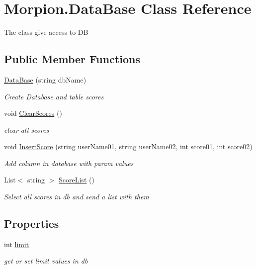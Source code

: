 \hypertarget{class_morpion_1_1_data_base}{}\section{Morpion.\+Data\+Base Class Reference}
\label{class_morpion_1_1_data_base}


The class give access to DB  


\subsection*{Public Member Functions}
\begin{DoxyCompactItemize}
\item 
\hyperlink{class_morpion_1_1_data_base_a0d69b39dbf424f7d4105df7a3ec0a586}{Data\+Base} (string db\+Name)
\begin{DoxyCompactList}\small\item\em Create Database and table scores \end{DoxyCompactList}\item 
void \hyperlink{class_morpion_1_1_data_base_a08b6bf1e688f66fbde3e818e08503be6}{Clear\+Scores} ()
\begin{DoxyCompactList}\small\item\em clear all scores \end{DoxyCompactList}\item 
void \hyperlink{class_morpion_1_1_data_base_ac964919b18e41d29326dd96ff9694d5a}{Insert\+Score} (string user\+Name01, string user\+Name02, int score01, int score02)
\begin{DoxyCompactList}\small\item\em Add column in database with param values \end{DoxyCompactList}\item 
List$<$ string $>$ \hyperlink{class_morpion_1_1_data_base_a45bfe0e1b60c377da0b085cb2590b7bf}{Score\+List} ()
\begin{DoxyCompactList}\small\item\em Select all scores in db and send a list with them \end{DoxyCompactList}\end{DoxyCompactItemize}
\subsection*{Properties}
\begin{DoxyCompactItemize}
\item 
int \hyperlink{class_morpion_1_1_data_base_ac0104fe497ec69fc184498e3e904b41f}{limit}
\begin{DoxyCompactList}\small\item\em get or set limit values in db \end{DoxyCompactList}\end{DoxyCompactItemize}


